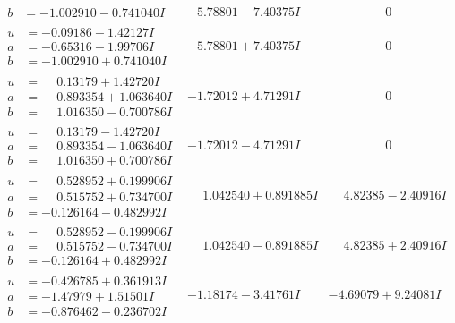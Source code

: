 \documentclass[1p]{elsarticle_modified}
\theoremstyle{definition}
\begin{document}
$$\begin{array}{c|c|c}
\begin{aligned}
b &= -1.002910 - 0.741040 I\end{aligned}
 & -5.78801 - 7.40375 I & \phantom{-0.000000 } 0 \\ \hline\begin{aligned}
u &= -0.09186 - 1.42127 I \\
a &= -0.65316 - 1.99706 I \\
b &= -1.002910 + 0.741040 I\end{aligned}
 & -5.78801 + 7.40375 I & \phantom{-0.000000 } 0 \\ \hline\begin{aligned}
u &= \phantom{-}0.13179 + 1.42720 I \\
a &= \phantom{-}0.893354 + 1.063640 I \\
b &= \phantom{-}1.016350 - 0.700786 I\end{aligned}
 & -1.72012 + 4.71291 I & \phantom{-0.000000 } 0 \\ \hline\begin{aligned}
u &= \phantom{-}0.13179 - 1.42720 I \\
a &= \phantom{-}0.893354 - 1.063640 I \\
b &= \phantom{-}1.016350 + 0.700786 I\end{aligned}
 & -1.72012 - 4.71291 I & \phantom{-0.000000 } 0 \\ \hline\begin{aligned}
u &= \phantom{-}0.528952 + 0.199906 I \\
a &= \phantom{-}0.515752 + 0.734700 I \\
b &= -0.126164 - 0.482992 I\end{aligned}
 & \phantom{-}1.042540 + 0.891885 I & \phantom{-}4.82385 - 2.40916 I \\ \hline\begin{aligned}
u &= \phantom{-}0.528952 - 0.199906 I \\
a &= \phantom{-}0.515752 - 0.734700 I \\
b &= -0.126164 + 0.482992 I\end{aligned}
 & \phantom{-}1.042540 - 0.891885 I & \phantom{-}4.82385 + 2.40916 I \\ \hline\begin{aligned}
u &= -0.426785 + 0.361913 I \\
a &= -1.47979 + 1.51501 I \\
b &= -0.876462 - 0.236702 I\end{aligned}
 & -1.18174 - 3.41761 I & -4.69079 + 9.24081 I \\ \hline\begin{aligned}

\end{aligned}
\end{array}$$
\end{document}
